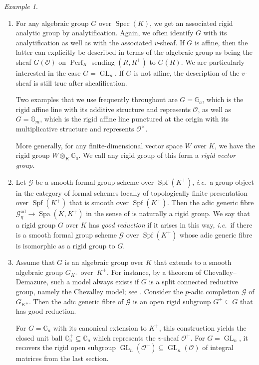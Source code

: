 \documentclass[11pt]{amsart}
\numberwithin{equation}{section}
\theoremstyle{definition}
\theoremstyle{remark}
\newtheorem{Example}[thm]{Example}
\newcommand{\G}{\mathbb{G}}
\renewcommand{\O}{\mathcal{O}}
\newcommand{\GL}{\operatorname{GL}}
\newcommand{\Perf}{\operatorname{Perf}}
\newcommand{\Spec}{\operatorname{Spec}}
\newcommand{\Spa}{\operatorname{Spa}}
\newcommand{\ad}{\mathrm{ad}}
\newcommand{\Spf}{\operatorname{Spf}}
\newcommand{\mG}{\mathcal{G}}
\begin{document}
\begin{Example}\label{ex:rigid-groups}\leavevmode
	\begin{enumerate}
\item 
For any algebraic group $G$ over $\Spec(K)$, we get an associated rigid analytic group by analytification. Again, we often identify $G$ with its analytification as well as with the associated $v$-sheaf. If $G$ is affine, then the latter can explicitly be described in terms of the algebraic group as being the sheaf $G(\O)$ on $\Perf_K$ sending $(R,R^+)$ to $G(R)$. We are particularly interested in the case $G=\GL_n$. 
If $G$ is not affine, the description of the $v$-sheaf is still true after sheafification. 

Two examples that we use frequently throughout are $G=\G_a$, which is the rigid affine line with its additive structure and represents $\O$, as well as $G=\G_m$, which is the rigid affine line punctured at the origin with its multiplicative structure and represents $\O^\times$.

More generally, for any finite-dimensional vector space $W$ over $K$, we have the rigid group $W\otimes_K\G_a$. We call any rigid group of this form a \emph{rigid vector group.}
\item Let $\mG$ be a smooth formal group scheme over $\Spf(K^+)$, \textit{i.e.}~a group object in the category of formal schemes locally of topologically finite presentation over $\Spf(K^+)$ that is smooth over $\Spf(K^+)$. Then the adic generic fibre $\mathcal G^{\ad}_{\eta}\to\Spa(K,K^+)$ in the sense of \cite[Section~2.2]{ScholzeWeinstein} is naturally a rigid group. 
We say that a rigid group $G$ over $K$ has \emph{good reduction} if it arises in this way, \textit{i.e.}~if there is a smooth formal group scheme $\mathcal G$ over $\Spf(K^+)$ whose adic generic fibre  is isomorphic as a rigid group to $G$.
\item Assume that $G$ is an algebraic group over $K$ that extends to a smooth algebraic group $G_{K^+}$ over~$K^+$.  For instance, by a theorem of Chevalley--Demazure, such a model always exists if $G$ is a split connected reductive group, namely the Chevalley model; see \cite[Corollaire XXV.1.2]{SGA3}. Consider the $p$-adic completion  $\mathcal G$ of $G_{K^+}$. Then the adic generic fibre of $\mathcal G$ is an open rigid subgroup $G^+\subseteq G$ that has good reduction. 

For $G=\G_a$ with its canonical extension to $K^+$, this construction yields the closed unit ball $\G_a^+\subseteq \G_a$ which represents the $v$-sheaf $\O^+$.
For $G=\GL_n$, it recovers the rigid open subgroup $\GL_n(\O^+)\subseteq \GL_n(\O)$ of integral matrices from the last section.
\end{enumerate}
\end{Example}
\end{document}
